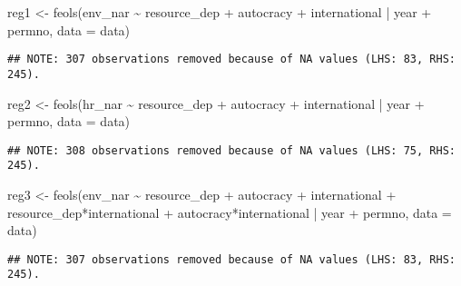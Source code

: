 \documentclass[
]{article}
\newenvironment{Shaded}{\begin{snugshade}}{\end{snugshade}}
\newcommand{\AttributeTok}[1]{\textcolor[rgb]{0.77,0.63,0.00}{#1}}
\newcommand{\FunctionTok}[1]{\textcolor[rgb]{0.00,0.00,0.00}{#1}}
\newcommand{\NormalTok}[1]{#1}
\newcommand{\OtherTok}[1]{\textcolor[rgb]{0.56,0.35,0.01}{#1}}
\newcommand{\SpecialCharTok}[1]{\textcolor[rgb]{0.00,0.00,0.00}{#1}}
\begin{document}
\begin{Shaded}
\begin{Highlighting}[]
\NormalTok{reg1 }\OtherTok{\textless{}{-}} \FunctionTok{feols}\NormalTok{(env\_nar }\SpecialCharTok{\textasciitilde{}}\NormalTok{ resource\_dep }\SpecialCharTok{+}\NormalTok{ autocracy }\SpecialCharTok{+}\NormalTok{ international }\SpecialCharTok{|}\NormalTok{ year }\SpecialCharTok{+}\NormalTok{ permno, }
              \AttributeTok{data =}\NormalTok{ data)}
\end{Highlighting}
\end{Shaded}

\begin{verbatim}
## NOTE: 307 observations removed because of NA values (LHS: 83, RHS: 245).
\end{verbatim}

\begin{Shaded}
\begin{Highlighting}[]
\NormalTok{reg2 }\OtherTok{\textless{}{-}} \FunctionTok{feols}\NormalTok{(hr\_nar }\SpecialCharTok{\textasciitilde{}}\NormalTok{ resource\_dep }\SpecialCharTok{+}\NormalTok{ autocracy }\SpecialCharTok{+}\NormalTok{ international }\SpecialCharTok{|}\NormalTok{ year }\SpecialCharTok{+}\NormalTok{ permno, }
              \AttributeTok{data =}\NormalTok{ data)}
\end{Highlighting}
\end{Shaded}

\begin{verbatim}
## NOTE: 308 observations removed because of NA values (LHS: 75, RHS: 245).
\end{verbatim}

\begin{Shaded}
\begin{Highlighting}[]
\NormalTok{reg3 }\OtherTok{\textless{}{-}} \FunctionTok{feols}\NormalTok{(env\_nar }\SpecialCharTok{\textasciitilde{}}\NormalTok{ resource\_dep }\SpecialCharTok{+}\NormalTok{ autocracy }\SpecialCharTok{+}\NormalTok{ international }
              \SpecialCharTok{+}\NormalTok{ resource\_dep}\SpecialCharTok{*}\NormalTok{international }\SpecialCharTok{+}\NormalTok{ autocracy}\SpecialCharTok{*}\NormalTok{international }\SpecialCharTok{|}\NormalTok{ year }\SpecialCharTok{+}\NormalTok{ permno, }
              \AttributeTok{data =}\NormalTok{ data)}
\end{Highlighting}
\end{Shaded}

\begin{verbatim}
## NOTE: 307 observations removed because of NA values (LHS: 83, RHS: 245).
\end{verbatim}
\end{document}
